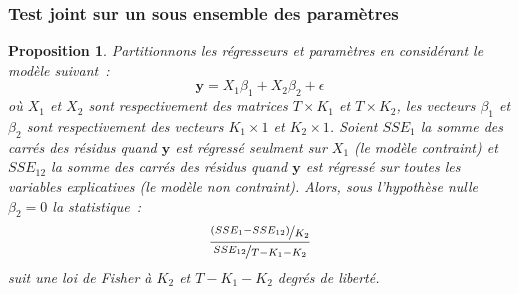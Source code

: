 \documentclass[10pt]{beamer}
\theoremstyle{plain}
\newtheorem{prop}{Proposition}
\begin{document}
\begin{frame}
  \frametitle{Test joint sur un sous ensemble des paramètres}

  \begin{prop}\label{prop:test-subset-parameters}
    Partitionnons les régresseurs et paramètres en considérant le modèle suivant~:
    \[
      \mathbf y = X_1\beta_1 + X_2\beta_2 + \epsilon
    \]
    où $X_1$ et $X_2$ sont respectivement des matrices $T\times K_1$ et $T\times K_2$, les vecteurs $\beta_1$ et $\beta_2$ sont respectivement des vecteurs $K_1\times 1$ et $K_2\times 1$. Soient $SSE_1$ la somme des carrés des résidus quand $\mathbf y$ est régressé seulment sur $X_1$ (le modèle contraint) et $SSE_{12}$ la somme des carrés des résidus quand $\mathbf y$ est régressé sur toutes les variables explicatives (le modèle non contraint). Alors, sous l'hypothèse nulle $\beta_2=0$ la statistique~:
    \[
\frac{\nicefrac{\left(SSE_1-SSE_{12}\right)}{K_2}}{\nicefrac{SSE_{12}}{T-K_1-K_2}}
    \]
    suit une loi de Fisher à $K_2$ et $T-K_1-K_2$ degrés de liberté.
  \end{prop}

\end{frame}
\end{document}

